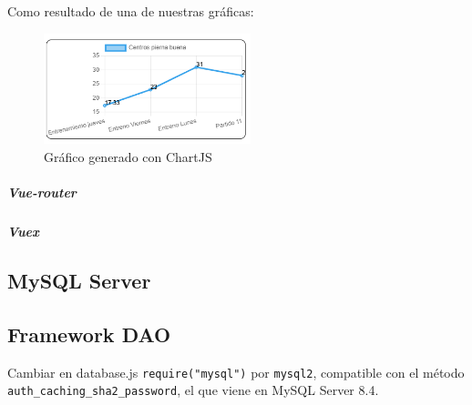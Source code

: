 Como resultado de una de nuestras gráficas:
\begin{figure}[H]
    \centering
    \includegraphics[width=6cm]{archivos/tfg_jorge/chartjs_ejemplo}
    \caption{Gráfico generado con ChartJS}
    \label{sistemass2}
\end{figure}

\subparagraph{Vue-router}

\subparagraph{Vuex}


\subsection{MySQL Server}

\subsection{Framework DAO}
Cambiar en database.js \lstinline|require("mysql")| por \lstinline|mysql2|, compatible con el método \lstinline|auth_caching_sha2_password|, el que viene en MySQL Server 8.4.

